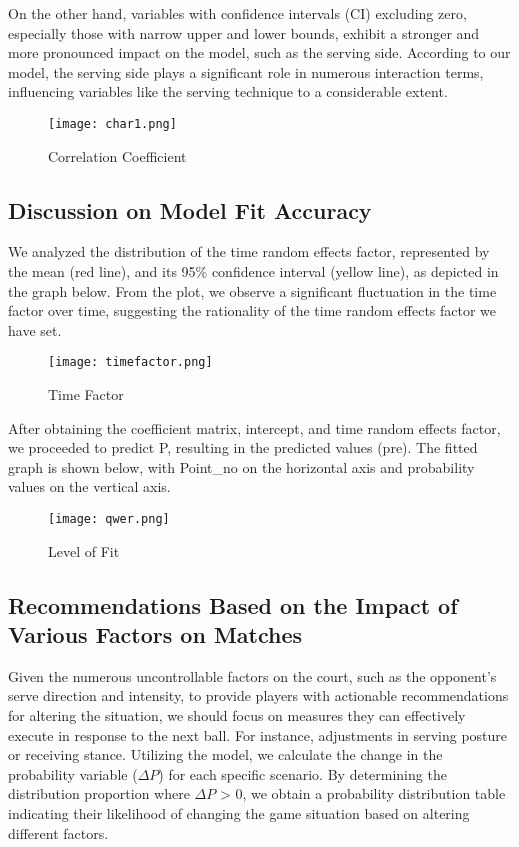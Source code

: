 \documentclass[12pt]{article}
\begin{document}
On the other hand, variables with confidence intervals (CI) excluding zero, especially those with narrow upper and lower bounds, exhibit a stronger and more pronounced impact on the model, such as the serving side. According to our model, the serving side plays a significant role in numerous interaction terms, influencing variables like the serving technique to a considerable extent.

\begin{figure}[H]
	\centering
	\texttt{[image: char1.png]}
	\caption{Correlation Coefficient}\label{tb:char1}
\end{figure}

\subsection{Discussion on Model Fit Accuracy}

We analyzed the distribution of the time random effects factor, represented by the mean (red line), and its 95\% confidence interval (yellow line), as depicted in the graph below. From the plot, we observe a significant fluctuation in the time factor over time, suggesting the rationality of the time random effects factor we have set.

\begin{figure}[H]
	\centering
	\texttt{[image: timefactor.png]}
	\caption{Time Factor}\label{fig:timefactor}
\end{figure}

After obtaining the coefficient matrix, intercept, and time random effects factor, we proceeded to predict P, resulting in the predicted values (pre). The fitted graph is shown below, with Point\_no on the horizontal axis and probability values on the vertical axis.

\begin{figure}[H]
	\centering
	\texttt{[image: qwer.png]}
	\caption{Level of Fit}\label{fig:qwer}
\end{figure}

\subsection{Recommendations Based on the Impact of Various Factors on Matches}

Given the numerous uncontrollable factors on the court, such as the opponent's serve direction and intensity, to provide players with actionable recommendations for altering the situation, we should focus on measures they can effectively execute in response to the next ball. For instance, adjustments in serving posture or receiving stance. Utilizing the model, we calculate the change in the probability variable ($\Delta P$) for each specific scenario. By determining the distribution proportion where $ \Delta P $ > 0, we obtain a probability distribution table indicating their likelihood of changing the game situation based on altering different factors.
\end{document}
